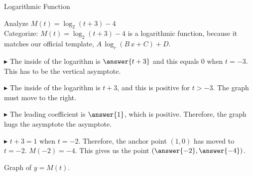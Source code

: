 \documentclass{ximera}
\begin{document}
\begin{example}  Logarithmic Function



Analyze   $M(t) = \log_2(t+3) - 4$ \\


Categorize: $M(t) = \log_2(t+3) - 4$ is a logarithmic function, because it matches our official template, $A \, \log_r(B \, x + C) + D$. \\


\begin{idea}

$\blacktriangleright$ The inside of the logarithm is $\answer{t+3}$ and this equals $0$ when $t=-3$.  This has to be the vertical asymptote.

$\blacktriangleright$ The inside of the logarithm is $t+3$, and this is positive for $t>-3$.  The graph must move to the right.

$\blacktriangleright$ The leading coefficient is $\answer{1}$, which is positive.  Therefore, the graph hugs the asymptote  the asymptote. 

$\blacktriangleright$ $t+3=1$ when $t=-2$. Therefore, the anchor point $(1,0)$ has moved to $t = -2$.  $M(-2) = -4$.  This gives us the point $\left( \answer{-2}, \answer{-4} \right)$.





Graph of $y = M(t)$.

\begin{image}
\end{image}
\end{idea}
\end{example}
\end{document}
